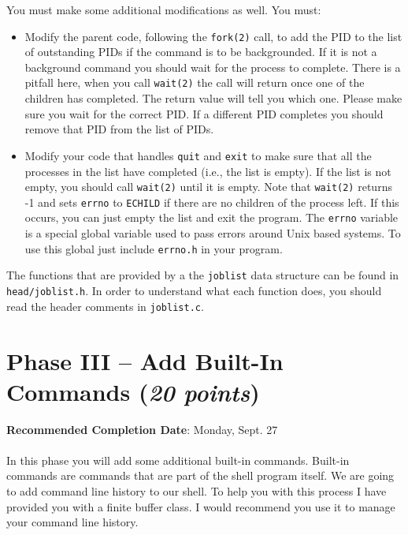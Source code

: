 \documentclass [12pt, letterpaper] {article}
\begin{document}
You must make some additional modifications as well. You must:
\begin{itemize}
 \item Modify the parent code, following the {\tt fork(2)} call, to add
       the PID to the list of outstanding  PIDs if the command is to be
       backgrounded. If it is not a background command you should wait for the
       process to complete. There is a pitfall here, when you call {\tt wait(2)}
       the call will return once one of the children has completed. The return
       value will tell you which one. Please make sure you wait for the correct
       PID. If a different PID completes you should remove that PID from the list
       of PIDs.
 \item Modify your code that handles {\tt quit} and {\tt exit} to make sure that all
       the processes in the list have completed (i.e., the list is empty). If
       the list is not empty, you should call {\tt wait(2)} until it is empty. Note
       that {\tt wait(2)} returns -1 and sets {\tt errno} to {\tt ECHILD} if there
       are no children of the process left. If this occurs, you can just empty
       the list and exit the program. The {\tt errno} variable is a special
       global variable used to pass errors around Unix based systems. To use
       this global just include {\tt errno.h} in your program.
\end{itemize}

The functions that are provided by a the {\tt joblist} data structure can be
found in \texttt{head/joblist.h}. In order to understand what each function does,
you should read the header comments in {\tt joblist.c}.

\section*{Phase III -- Add Built-In Commands (\emph{20 points})}
\noindent\textbf{Recommended Completion Date}: Monday, Sept. 27\\
\\
In this phase you will add some additional built-in commands. Built-in
commands are commands that are part of the shell program itself. We are
going to add command line history to our shell. To help you with this
process I have provided you with a finite buffer class. I would
recommend you use it to manage your command line history.
\end{document}
